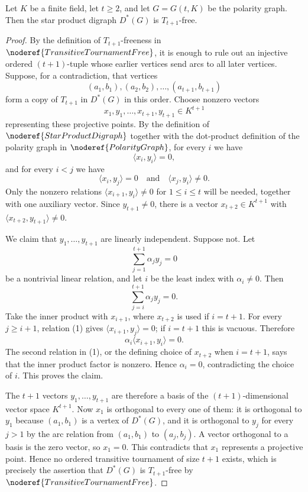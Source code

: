 \begin{lemma}
Let \(K\) be a finite field, let \(t\ge2\), and let \(G=G(t,K)\) be the
polarity graph.  Then the star product digraph \(D^*(G)\) is
\(T_{t+1}\)-free.
\end{lemma}
\begin{proof}
By the definition of \(T_{t+1}\)-freeness in
\(\noderef{TransitiveTournamentFree}\), it is enough to rule out an injective
ordered \((t+1)\)-tuple whose earlier vertices send arcs to all later
vertices.  Suppose, for a contradiction, that vertices
\[
  (a_1,b_1),(a_2,b_2),\ldots,(a_{t+1},b_{t+1})
\]
form a copy of \(T_{t+1}\) in \(D^*(G)\) in this order.  Choose nonzero
vectors
\[
  x_1,y_1,\ldots,x_{t+1},y_{t+1}\in K^{t+1}
\]
representing these projective points.  By the definition of
\(\noderef{StarProductDigraph}\) together with the dot-product definition of
the polarity graph in \(\noderef{PolarityGraph}\), for every \(i\) we have
\[
  \langle x_i,y_i\rangle=0,
\]
and for every \(i<j\) we have
\[
  \langle x_i,y_j\rangle=0
  \quad\text{and}\quad
  \langle x_j,y_i\rangle\ne0. \tag{1}
\]
Only the nonzero relations \(\langle x_{i+1},y_i\rangle\ne0\) for
\(1\le i\le t\) will be needed, together with one auxiliary vector.  Since
\(y_{t+1}\ne0\), there is a vector \(x_{t+2}\in K^{t+1}\) with
\(\langle x_{t+2},y_{t+1}\rangle\ne0\).

We claim that \(y_1,\ldots,y_{t+1}\) are linearly independent.  Suppose not.
Let
\[
  \sum_{j=1}^{t+1}\alpha_j y_j=0
\]
be a nontrivial linear relation, and let \(i\) be the least index with
\(\alpha_i\ne0\).  Then
\[
  \sum_{j=i}^{t+1}\alpha_j y_j=0.
\]
Take the inner product with \(x_{i+1}\), where \(x_{t+2}\) is used if
\(i=t+1\).  For every \(j\ge i+1\), relation (1) gives
\(\langle x_{i+1},y_j\rangle=0\); if \(i=t+1\) this is vacuous.  Therefore
\[
  \alpha_i\langle x_{i+1},y_i\rangle=0.
\]
The second relation in (1), or the defining choice of \(x_{t+2}\) when
\(i=t+1\), says that the inner product factor is nonzero.  Hence
\(\alpha_i=0\), contradicting the choice of \(i\).  This proves the claim.

The \(t+1\) vectors \(y_1,\ldots,y_{t+1}\) are therefore a basis of the
\((t+1)\)-dimensional vector space \(K^{t+1}\).  Now \(x_1\) is orthogonal to
every one of them: it is orthogonal to \(y_1\) because \((a_1,b_1)\) is a
vertex of \(D^*(G)\), and it is orthogonal to \(y_j\) for every \(j>1\) by
the arc relation from \((a_1,b_1)\) to \((a_j,b_j)\).  A vector orthogonal to
a basis is the zero vector, so \(x_1=0\).  This contradicts that \(x_1\)
represents a projective point.  Hence no ordered transitive tournament of
size \(t+1\) exists, which is precisely the assertion that \(D^*(G)\) is
\(T_{t+1}\)-free by \(\noderef{TransitiveTournamentFree}\).
\end{proof}
